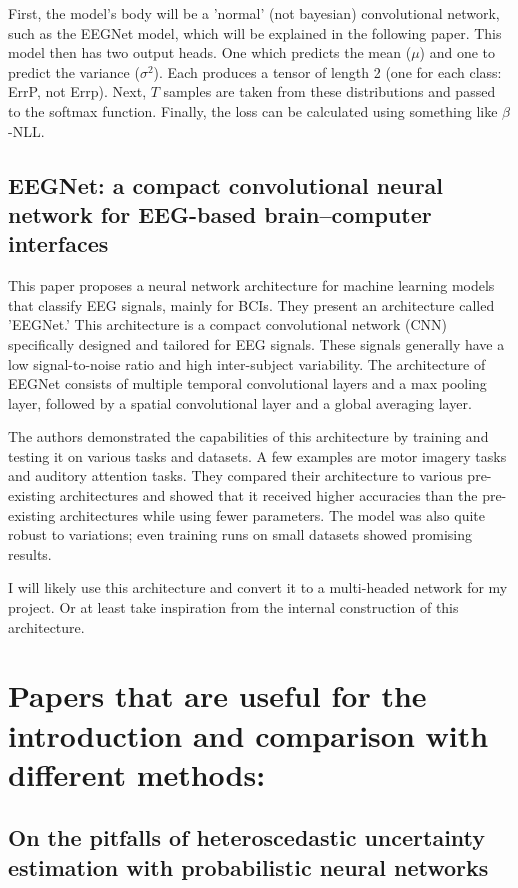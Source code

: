 \documentclass[10pt]{article}
\begin{document}
First, the model's body will be a 'normal' (not bayesian) convolutional network, such as the EEGNet model, which will be explained in the following paper. This model then has two output heads. One which predicts the mean ($\mu$) and one to predict the variance ($\sigma^2$). Each produces a tensor of length 2 (one for each class: ErrP, not Errp). Next, $T$ samples are taken from these distributions and passed to the softmax function. Finally, the loss can be calculated using something like $\beta$-NLL.


\subsection*{EEGNet: a compact convolutional neural network for EEG-based brain--computer interfaces \cite{lawhern2018eegnet}}

This paper proposes a neural network architecture for machine learning models that classify EEG signals, mainly for BCIs. They present an architecture called 'EEGNet.' This architecture is a compact convolutional network (CNN) specifically designed and tailored for EEG signals. These signals generally have a low signal-to-noise ratio and high inter-subject variability. The architecture of EEGNet consists of multiple temporal convolutional layers and a max pooling layer, followed by a spatial convolutional layer and a global averaging layer.

The authors demonstrated the capabilities of this architecture by training and testing it on various tasks and datasets. A few examples are motor imagery tasks and auditory attention tasks. They compared their architecture to various pre-existing architectures and showed that it received higher accuracies than the pre-existing architectures while using fewer parameters. The model was also quite robust to variations; even training runs on small datasets showed promising results.

I will likely use this architecture and convert it to a multi-headed network for my project. Or at least take inspiration from the internal construction of this architecture.

\section*{Papers that are useful for the introduction and comparison with different methods:}

\subsection*{On the pitfalls of heteroscedastic uncertainty estimation with probabilistic neural networks \cite{seitzer2022pitfalls}}
\end{document}
